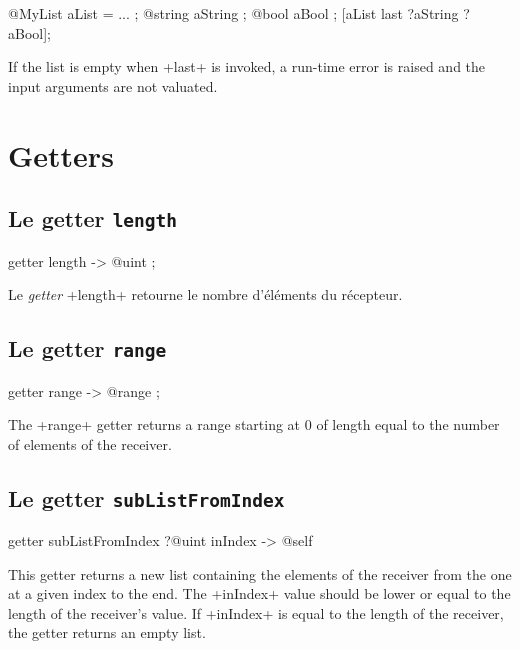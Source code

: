 \begin{galgas}
@MyList aList = ... ;
@string aString ;
@bool aBool ;
[aList last ?aString ?aBool];
\end{galgas}


If the list is empty when \ggs+last+ is invoked, a run-time error is raised and the input arguments are not valuated.








\section{Getters}

\subsection{Le getter \texttt{length}}

\begin{galgas}
getter length -> @uint ;
\end{galgas}

Le \emph{getter} \ggs+length+ retourne le nombre d'éléments du récepteur.


\subsection{Le getter \texttt{range}}

\begin{galgas}
getter range -> @range ;
\end{galgas}

The \ggs+range+ getter returns a range starting at $0$ of length equal to the number of elements of the receiver.




\subsection{Le getter \texttt{subListFromIndex}}

\begin{galgas}
getter subListFromIndex ?@uint inIndex -> @self
\end{galgas}

This getter returns a new list containing the elements of the receiver from the one at a given index to the end. The  \ggs+inIndex+ value should be lower or equal to the length of the receiver's value. If \ggs+inIndex+ is equal to the length of the receiver, the getter returns an empty list.






